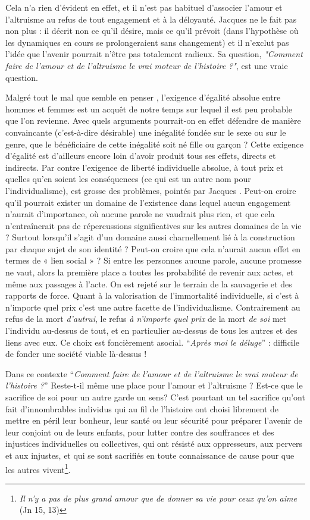 Cela n'a rien d'évident en effet, et il n'est pas habituel d'associer l'amour et l'altruisme au refus de tout engagement et à la déloyauté. Jacques  ne le fait pas non plus : il décrit non ce qu'il désire, mais ce qu'il prévoit (dans l'hypothèse où les dynamiques en cours se prolongeraient sans changement) et il n'exclut pas l'idée que l'avenir pourrait n'être pas totalement radieux. Sa question, \emph{"Comment faire de l'amour et de l'altruisme le vrai moteur de l'histoire ?"}, est une vraie question.

 Malgré tout le mal que semble en penser , l'exigence d'égalité absolue entre hommes et femmes est un acquêt de notre temps sur lequel il est peu probable que l'on revienne. Avec quels arguments pourrait-on en effet défendre de manière convaincante (c'est-à-dire désirable) une inégalité fondée sur le sexe ou sur le genre, que le bénéficiaire de cette inégalité soit né fille ou garçon ? Cette exigence d'égalité est d'ailleurs encore loin d'avoir produit tous ses effets, directs et indirects. Par contre l'exigence de liberté individuelle absolue, à tout prix et quelles qu'en soient les conséquences (ce qui est un autre nom pour l'individualisme), est grosse des problèmes, pointés par Jacques . Peut-on croire qu'il pourrait exister un domaine de l'existence dans lequel aucun engagement n'aurait d'importance, où aucune parole ne vaudrait plus rien, et que cela n'entraînerait pas de répercussions significatives sur les autres domaines de la vie ? Surtout lorsqu'il s'agit d'un domaine aussi charnellement lié à la construction par chaque sujet de son identité ? Peut-on croire que cela n'aurait aucun effet en termes de « lien social » ? Si entre les personnes aucune parole, aucune promesse ne vaut, alors la première place a toutes les probabilité de revenir aux actes, et même aux passages à l'acte. On est rejeté sur le terrain de la sauvagerie et des rapports de force. Quant à la valorisation de l'immortalité individuelle, si c'est à n'importe quel prix c'est une autre facette de l'individualisme. Contrairement au refus de la mort \emph{d'autrui}, le refus \emph{à n'importe quel prix} de la mort \emph{de soi} met l'individu au-dessus de tout, et en particulier au-dessus de tous les autres et des liens avec eux. Ce choix est foncièrement asocial. \enquote{\emph{Après moi le déluge}} : difficile de fonder une société viable là-dessus !

 Dans ce contexte \enquote{\emph{Comment faire de l'amour et de l'altruisme le vrai moteur de l'histoire ?}} Reste-t-il même une place pour l'amour et l'altruisme ? Est-ce que le sacrifice de soi pour un autre garde un sens? C'est pourtant un tel sacrifice qu'ont fait d'innombrables individus qui au fil de l'histoire ont choisi librement de mettre en péril leur bonheur, leur santé ou leur sécurité pour préparer l'avenir de leur conjoint ou de leurs enfants, pour lutter contre des souffrances et des injustices individuelles ou collectives, qui ont résisté aux oppresseurs, aux pervers et aux injustes, et qui se sont sacrifiés en toute connaissance de cause pour que les autres vivent\footnote{\emph{Il n'y a pas de plus grand amour que de donner sa vie pour ceux qu'on aime} (Jn 15, 13)}. 
 
